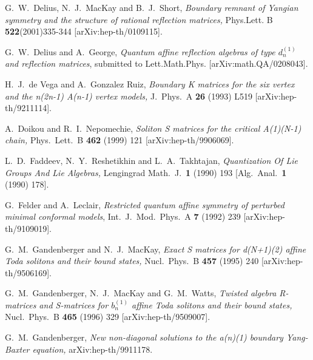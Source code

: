 \documentclass[a4paper,12pt]{article}
\numberwithin{equation}{section}
\begin{document}
{\begin{thebibliography}{99}
G.~W.~Delius, N.~J.~MacKay and B.~J.~Short, \textit{Boundary
remnant of Yangian symmetry and the structure of rational
reflection matrices,} Phys.Lett. B {\bf 522}(2001)335-344
[arXiv:hep-th/0109115].

G.~W.~Delius and A.~George, \textit{Quantum affine reflection
algebras of type $d_n^{(1)}$ and reflection matrices}, submitted
to Lett.Math.Phys. [arXiv:math.QA/0208043].

H.~J.~de Vega and A.~Gonzalez Ruiz, \textit{Boundary K matrices
for the six vertex and the n(2n-1) A(n-1) vertex models,} J.\
Phys.\ A {\bf 26} (1993) L519 [arXiv:hep-th/9211114].

A.~Doikou and R.~I.~Nepomechie, \textit{Soliton S matrices for the
critical A(1)(N-1) chain,} Phys.\ Lett.\ B {\bf 462} (1999) 121
[arXiv:hep-th/9906069].

L.~D.~Faddeev, N.~Y.~Reshetikhin and L.~A.~Takhtajan,
\textit{Quantization Of Lie Groups And Lie Algebras,} Lengingrad
Math.\ J.\  {\bf 1} (1990) 193 [Alg.\ Anal.\  {\bf 1} (1990) 178].

G.~Felder and A.~Leclair, \textit{Restricted quantum affine
symmetry of perturbed minimal conformal models}, Int.\ J.\ Mod.\
Phys.\ A {\bf 7} (1992) 239 [arXiv:hep-th/9109019].

G.~M.~Gandenberger and N.~J.~MacKay, \textit{Exact S matrices for
d(N+1)(2) affine Toda solitons and their bound states,} Nucl.\
Phys.\ B {\bf 457} (1995) 240 [arXiv:hep-th/9506169].

G.~M.~Gandenberger, N.~J.~MacKay and G.~M.~Watts, \textit{Twisted
algebra R-matrices and S-matrices for $b_n^{(1)}$ affine Toda
solitons and their bound states,} Nucl.\ Phys.\ B {\bf 465} (1996)
329 [arXiv:hep-th/9509007].


G.~M.~Gandenberger, \textit{New non-diagonal solutions to the
a(n)(1) boundary Yang-Baxter  equation,} arXiv:hep-th/9911178.


\end{thebibliography}}
\end{document}
